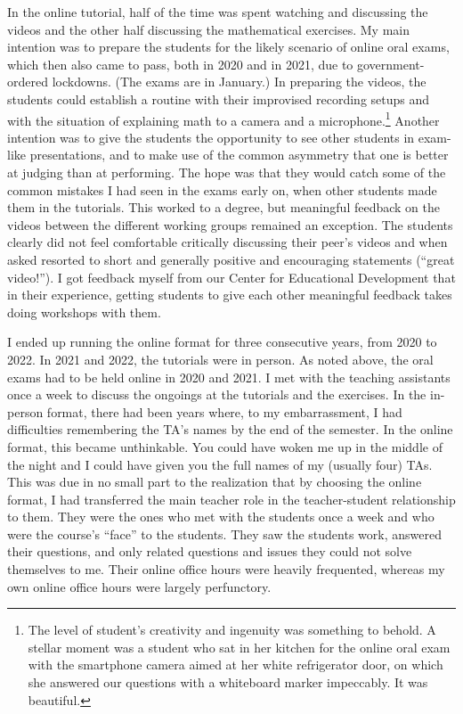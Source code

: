 \documentclass[graybox]{svmult}
\begin{document}
In the online tutorial, half of the time was spent watching and discussing the videos and the other half discussing the mathematical exercises. My main intention was to prepare the students for the likely scenario of online oral exams, which then also came to pass, both in 2020 and in 2021, due to government-ordered lockdowns. (The exams are in January.) In preparing the videos, the students could establish a routine with their improvised recording setups and with the situation of explaining math to a camera and a microphone.\footnote{The level of student's creativity and ingenuity was something to behold. A stellar moment was a student who sat in her kitchen for the online oral exam with the smartphone camera aimed at her white refrigerator door, on which she answered our questions with a whiteboard marker impeccably. It was beautiful.} Another intention was to give the students the opportunity to see other students in exam-like presentations, and to make use of the common asymmetry that one is better at judging than at performing. The hope was that they would catch some of the common mistakes I had seen in the exams early on, when other students made them in the tutorials. This worked to a degree, but meaningful feedback on the videos between the different working groups remained an exception. The students clearly did not feel comfortable critically discussing their peer's videos and when asked resorted to short and generally positive and encouraging statements (``great video!''). I got feedback myself from our Center for Educational Development that in their experience, getting students to give each other meaningful feedback takes doing workshops with them.  

I ended up running the online format for three consecutive years, from 2020 to 2022. In 2021 and 2022, the tutorials were in person. As noted above, the oral exams had to be held online in 2020 and 2021. I met with the teaching assistants once a week to discuss the ongoings at the tutorials and the exercises. In the in-person format, there had been years where, to my embarrassment, I had difficulties remembering the TA's names by the end of the semester. In the online format, this became unthinkable. You could have woken me up in the middle of the night and I could have given you the full names of my (usually four) TAs. This was due in no small part to the realization that by choosing the online format, I had transferred the main teacher role in the teacher-student relationship to them. They were the ones who met with the students once a week and who were the course's ``face'' to the students. They saw the students work, answered their questions, and only related questions and issues they could not solve themselves to me. Their online office hours were heavily frequented, whereas my own online office hours were largely perfunctory. 
\end{document}
